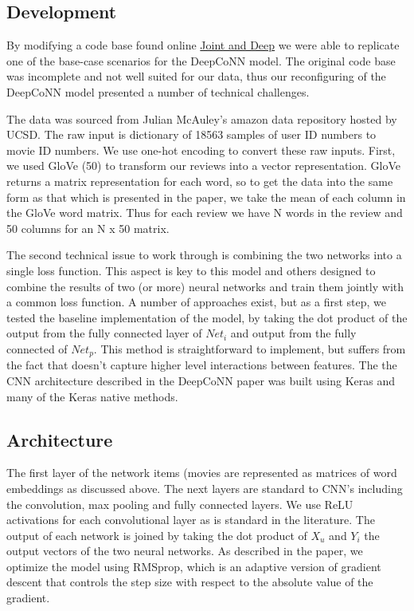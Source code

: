 \documentclass[10pt,twocolumn,letterpaper]{article}
\begin{document}
\subsection{Development}

By modifying a code base found online \href{https://github.com/Praznat/uifud/tree/291b0882b02bf77edf9b310aeeb345784113b1f5}{Joint and Deep} we were able to replicate one of the base-case scenarios for the DeepCoNN model. The original code base was incomplete and not well suited for our data, thus our reconfiguring of the DeepCoNN model presented a number of technical challenges. 

The data was sourced from Julian McAuley's amazon data repository hosted by UCSD. The raw input is dictionary of 18563 samples of user ID numbers to movie ID numbers. We use one-hot encoding to convert these raw inputs. First, we used GloVe (50) to transform our reviews into a vector representation. GloVe returns a matrix representation for each word, so to get the data into the same form as that which is presented in the paper, we take the mean of each column in the GloVe word matrix. Thus for each review we have N words in the review and 50 columns for an N x 50 matrix.

The second technical issue to work through is combining the two networks into a single loss function. This aspect is key to this model and others designed to combine the results of two (or more) neural networks and train them jointly with a common loss function. A number of approaches exist, but as a first step, we tested the baseline implementation of the model, by taking the dot product of the output from the fully connected layer of $Net_{i}$ and output from the fully connected of $Net_{p}$. This method is straightforward to implement, but suffers from the fact that doesn't capture higher level interactions between features.  The the CNN architecture described in the DeepCoNN paper was built using Keras and many of the Keras native methods. 


\subsection{Architecture}

The first layer of the network items (movies are represented as matrices of word embeddings as discussed above. The next layers are standard to CNN's including the convolution, max pooling and fully connected layers.  We use ReLU activations for each convolutional layer as is standard in the literature. The output of each network is joined by taking the dot product of $X_{u}$ and $Y_{i}$ the output vectors of the two neural networks. As described in the paper, we optimize the model using RMSprop, which is an adaptive version of gradient descent that controls the step size with respect to the absolute value of the gradient. 
\end{document}
